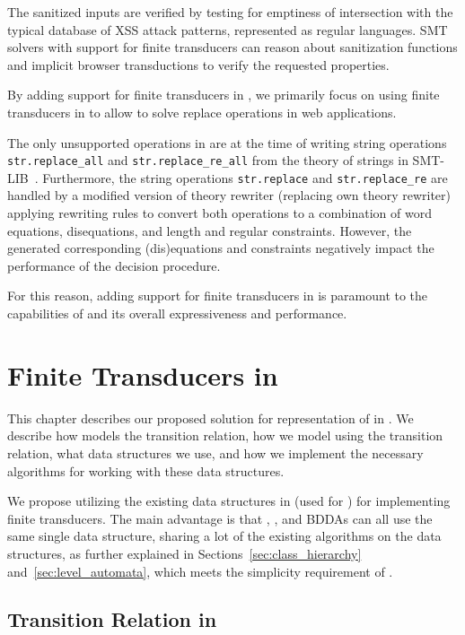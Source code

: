 The sanitized inputs are verified by testing for emptiness of intersection with the typical database of XSS attack patterns, represented as regular languages.
SMT solvers with support for finite transducers can reason about sanitization functions and implicit browser transductions to verify the requested properties.

By adding support for finite transducers in \mata, we primarily focus on using finite transducers in \noodler to allow \noodler to solve replace operations in web applications.

The only unsupported operations in \noodler are at the time of writing string operations \texttt{str.replace\_all} and \texttt{str.replace\_re\_all} from the theory of strings in SMT-LIB~\cite{smtlib_theory_strings}.
Furthermore, the string operations \texttt{str.replace} and \texttt{str.replace\_re} are handled by a modified \noodler version of theory rewriter (replacing \ziii own theory rewriter) applying rewriting rules to convert both operations to a combination of word equations, disequations, and length and regular constraints.
However, the generated corresponding (dis)equations and constraints negatively impact the performance of the decision procedure.

For this reason, adding support for finite transducers in \mata is paramount to the capabilities of \noodler and its overall expressiveness and performance.

\chapter{Finite Transducers in \mata}

This chapter describes our proposed solution for representation of \nfts in \mata. We describe how \mata models the transition relation, how we model \nfts using the transition relation, what data structures we use, and how we implement the necessary algorithms for \nfts working with these data structures.

We propose utilizing the existing data structures in \mata (used for \nfas) for implementing finite transducers.
The main advantage is that \nfas, \nfts, and BDDAs can all use the same single data structure, sharing a lot of the existing algorithms on the data structures, as further explained in Sections~\ref{sec:class_hierarchy} and~\ref{sec:level_automata}, which meets the simplicity requirement of \mata.

\section{Transition Relation in \mata}
\label{sec:mata_data_structure}

